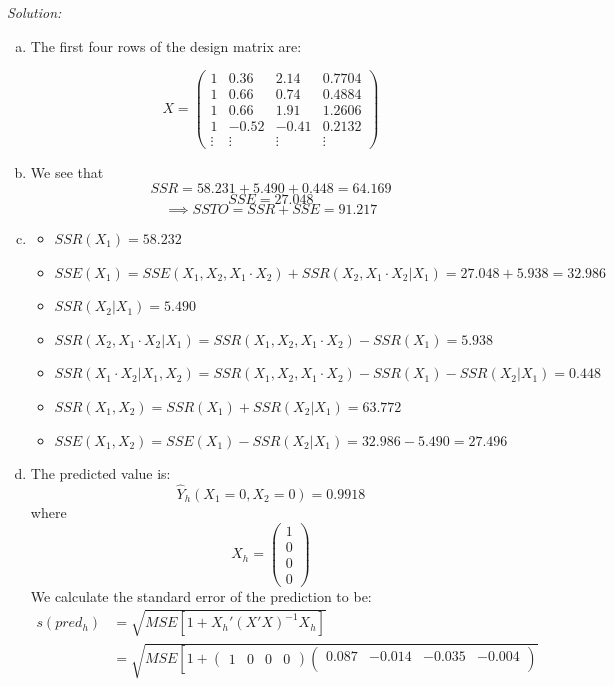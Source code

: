 \documentclass{article}
\newenvironment{solution}
    {\textit{Solution:}}
    {}
\begin{document}
\begin{solution}
\begin{enumerate}[(a)]
\item The first four rows of the design matrix are: 

$$X = \begin{pmatrix}
1 & 0.36 & 2.14 & 0.7704 \\
1 & 0.66 & 0.74 & 0.4884 \\
1 & 0.66 & 1.91 & 1.2606\\
1 & -0.52 & -0.41 & 0.2132 \\
\vdots & \vdots & \vdots & \vdots 
\end{pmatrix}$$
\item We see that 
$$SSR = 58.231 + 5.490 + 0.448 = 64.169$$
$$SSE = 27.048$$
$$\implies SSTO = SSR + SSE = 91.217$$
\item 
\begin{itemize}
\item $SSR(X_1) = 58.232$
\item $SSE(X_1) = SSE(X_1, X_2, X_1 \cdot X_2) + SSR(X_2, X_1 \cdot X_2 | X_1) = 27.048 + 5.938 = 32.986$
\item  $SSR(X_2 | X_1) = 5.490$
\item $SSR(X_2, X_1 \cdot X_2 | X_1) = SSR(X_1, X_2, X_1 \cdot X_2) - SSR(X_1) = 5.938$
\item $SSR(X_1 \cdot X_2 | X_1, X_2) = SSR(X_1, X_2, X_1 \cdot X_2) - SSR(X_1) - SSR(X_2 | X_1) = 0.448$
\item $SSR(X_1, X_2) = SSR(X_1) + SSR(X_2 | X_1) = 63.772$
\item $SSE(X_1, X_2) = SSE(X_1) - SSR(X_2 | X_1) = 32.986 - 5.490 = 27.496$
\end{itemize}
\item The predicted value is: 
$$\hat Y_{h}(X_1 = 0, X_2 = 0) = 0.9918$$
where 
$$X_h = \begin{pmatrix}
1 \\
0 \\
0 \\
0
\end{pmatrix}$$
We calculate the standard error of the prediction to be: 
\begin{align*}
s(pred_h) &= \sqrt{MSE \left [ 1 + X_h' (X'X)^{-1} X_h\right ]} \\
&= \sqrt{MSE \left [ 1 + \begin{pmatrix} 
1 & 0 & 0 & 0
\end{pmatrix} \begin{pmatrix}
0.087 & -0.014 &-0.035 & -0.004 \\

\end{pmatrix}}
\end{align*}
\end{enumerate}
\end{solution}
\end{document}
